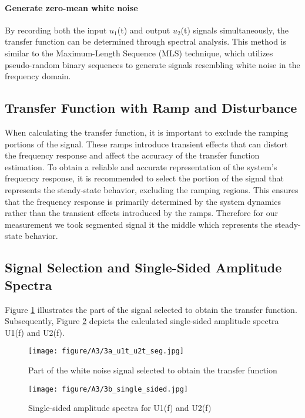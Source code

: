 \documentclass[
	a4paper,
	11pt,
]{article}
\begin{document}
\paragraph{Generate zero-mean white noise}
By recording both the input $u_1$(t) and output $u_2$(t) signals simultaneously, the transfer function can be determined through spectral analysis. This method is similar to the Maximum-Length Sequence (MLS) technique, which utilizes pseudo-random binary sequences to generate signals resembling white noise in the frequency domain. 

\subsection{Transfer Function with Ramp and Disturbance}
When calculating the transfer function, it is important to exclude the ramping portions of the signal. These ramps introduce transient effects that can distort the frequency response and affect the accuracy of the transfer function estimation. To obtain a reliable and accurate representation of the system's frequency response, it is recommended to select the portion of the signal that represents the steady-state behavior, excluding the ramping regions. This ensures that the frequency response is primarily determined by the system dynamics rather than the transient effects introduced by the ramps. Therefore for our measurement we took segmented signal it the middle which represents the steady-state behavior.

\subsection{Signal Selection and Single-Sided Amplitude Spectra}

Figure \ref{fig:A3a} illustrates the part of the signal selected to obtain the transfer function. Subsequently, Figure \ref{fig:A3b} depicts the calculated single-sided amplitude spectra U1(f) and U2(f).

\begin{figure}[h!]
    \centerline{\texttt{[image: figure/A3/3a\_u1t\_u2t\_seg.jpg]}}
    \caption{Part of the white noise signal selected to obtain the transfer function}
    \label{fig:A3a}
\end{figure}

\begin{figure}[h!]
    \centerline{\texttt{[image: figure/A3/3b\_single\_sided.jpg]}}
    \caption{Single-sided amplitude spectra for U1(f) and U2(f)}
    \label{fig:A3b}
\end{figure}
\end{document}
